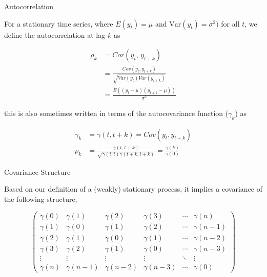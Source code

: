 \documentclass[11pt,ignorenonframetext,]{beamer}
\begin{document}
\begin{frame}[t]{Autocorrelation}

For a stationary time series, where \(E(y_t)=\mu\) and
\(\text{Var}(y_t)=\sigma^2)\) for all \(t\), we define the
autocorrelation at lag \(k\) as

\[
\begin{aligned}
\rho_k &= Cor(y_t, \, y_{t+k}) \\
       &= \frac{Cov(y_t, y_{t+k})}{\sqrt{Var(y_t)Var(y_{t+k})}} \\
       &= \frac{E\left( (y_t-\mu)(y_{t+k}-\mu) \right)}{\sigma^2}
\end{aligned}
\]

\pause

this is also sometimes written in terms of the autocovariance function
(\(\gamma_k\)) as

\[
\begin{aligned}
\gamma_k &= \gamma(t,t+k) = Cov(y_t, y_{t+k}) \\
\rho_k &= \frac{\gamma(t,t+k)}{\sqrt{\gamma(t,t) \gamma(t+k,t+k)}} = \frac{\gamma(k)}{\gamma(0)}
\end{aligned}
\]

\end{frame}

\begin{frame}{Covariance Structure}

Based on our definition of a (weakly) stationary process, it implies a
covariance of the following structure,

\[
\left(
\begin{matrix}
\gamma(0) & \gamma(1) & \gamma(2) & \gamma(3) & \cdots & \gamma(n) \\
\gamma(1) & \gamma(0) & \gamma(1) & \gamma(2) & \cdots & \gamma(n-1) \\
\gamma(2) & \gamma(1) & \gamma(0) & \gamma(1) & \cdots & \gamma(n-2) \\
\gamma(3) & \gamma(2) & \gamma(1) & \gamma(0) & \cdots & \gamma(n-3) \\
\vdots    & \vdots    & \vdots    & \vdots    & \ddots & \vdots \\
\gamma(n) & \gamma(n-1) & \gamma(n-2) & \gamma(n-3) & \cdots & \gamma(0)
\end{matrix}
\right)
\]

\end{frame}
\end{document}

